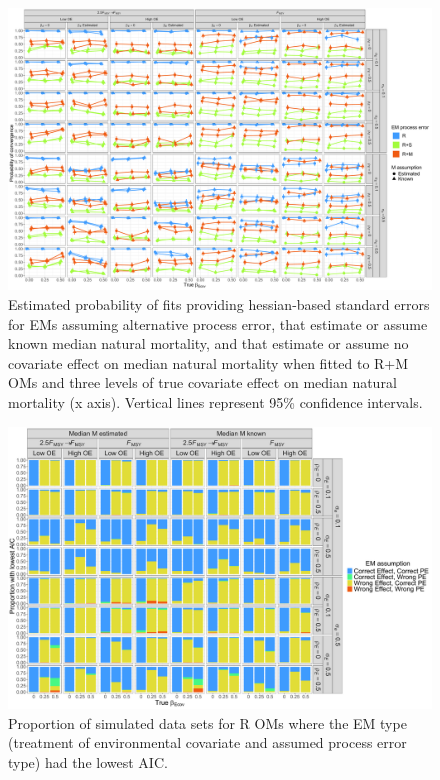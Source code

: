 \documentclass[
  12pt,
]{article}
\begin{document}
\begin{landscape}
\begin{figure}
\begin{center}
\includegraphics{convergence_RMom}
\end{center}
\caption{Estimated probability of fits providing hessian-based standard errors for EMs assuming alternative process error, that estimate or assume known median natural mortality, and that estimate or assume no covariate effect on median natural mortality when fitted to R+M OMs and three levels of true covariate effect on median natural mortality (x axis). Vertical lines represent 95\% confidence intervals.}\label{convergence_RMom}
\end{figure}
\end{landscape}

\begin{landscape}
\begin{figure}
\begin{center}
\includegraphics[height = \textheight]{aic_Rom}
\end{center}
\caption{Proportion of simulated data sets for R OMs where the EM type (treatment of environmental covariate and assumed process error type) had the lowest AIC.}\label{aic_Rom}
\end{figure}
\end{landscape}
\end{document}
